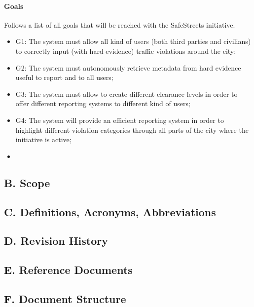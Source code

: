 \documentclass{report}
\begin{document}
    \paragraph{Goals} Follows a list of all goals that will be reached with the SafeStreets initiative.
    \begin{itemize}
        \item G1: The system must allow all kind of users (both third parties and civilians) to correctly input (with hard evidence) traffic violations around the city;
        \item G2: The system must autonomously retrieve metadata from hard evidence useful to report and to all users;
        \item G3: The system must allow to create different clearance levels in order to offer different reporting systems to different kind of users;
        \item G4: The system will provide an efficient reporting system in order to highlight different violation categories through all parts of the city where the initiative is active;
        \item 
    \end{itemize}

    \subsection*{B. Scope}
    \subsection*{C. Definitions, Acronyms, Abbreviations}
    \subsection*{D. Revision History}
    \subsection*{E. Reference Documents}
    \subsection*{F. Document Structure}
\end{document}
